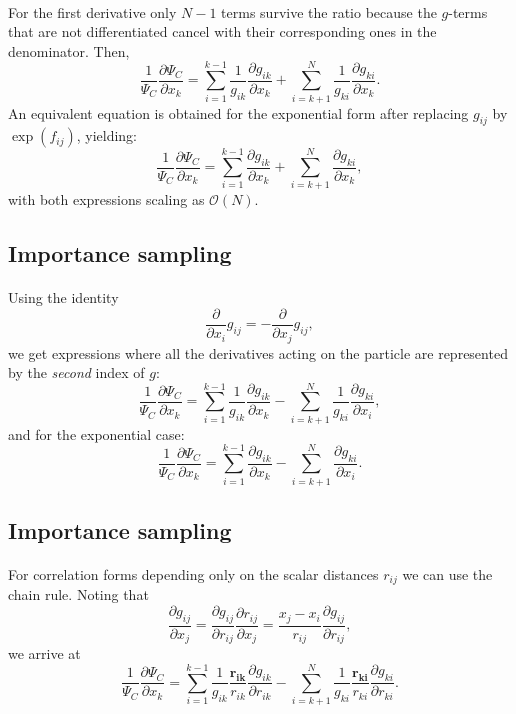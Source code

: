 \documentclass[%
twoside,                 %
final,                   %
10pt]{article}
\begin{document}
\paragraph{}
For the first derivative only $N-1$ terms survive the ratio because the $g$-terms that are not differentiated cancel with their corresponding ones in the denominator. Then,
\[
\frac{1}{\Psi_C}\frac{\partial \Psi_C}{\partial x_k} =
\sum_{i=1}^{k-1}\frac{1}{g_{ik}}\frac{\partial g_{ik}}{\partial x_k}
+
\sum_{i=k+1}^{N}\frac{1}{g_{ki}}\frac{\partial g_{ki}}{\partial x_k}.
\]
An equivalent equation is obtained for the exponential form after replacing $g_{ij}$ by $\exp(f_{ij})$, yielding:
\[
\frac{1}{\Psi_C}\frac{\partial \Psi_C}{\partial x_k} =
\sum_{i=1}^{k-1}\frac{\partial g_{ik}}{\partial x_k}
+
\sum_{i=k+1}^{N}\frac{\partial g_{ki}}{\partial x_k},
\]
with both expressions scaling as $\mathcal{O}(N)$.




\subsection*{Importance sampling}

\paragraph{}

Using the identity 
\[
\frac{\partial}{\partial x_i}g_{ij} = -\frac{\partial}{\partial x_j}g_{ij},
\]
we get expressions where all the derivatives acting on the particle  are represented by the \emph{second} index of $g$:
\[
\frac{1}{\Psi_C}\frac{\partial \Psi_C}{\partial x_k} =
\sum_{i=1}^{k-1}\frac{1}{g_{ik}}\frac{\partial g_{ik}}{\partial x_k}
-\sum_{i=k+1}^{N}\frac{1}{g_{ki}}\frac{\partial g_{ki}}{\partial x_i},
\]
and for the exponential case:
\[
\frac{1}{\Psi_C}\frac{\partial \Psi_C}{\partial x_k} =
\sum_{i=1}^{k-1}\frac{\partial g_{ik}}{\partial x_k}
-\sum_{i=k+1}^{N}\frac{\partial g_{ki}}{\partial x_i}.
\]



\subsection*{Importance sampling}

\paragraph{}
For correlation forms depending only on the scalar distances $r_{ij}$ we can use the chain rule. Noting that 
\[
\frac{\partial g_{ij}}{\partial x_j} = \frac{\partial g_{ij}}{\partial r_{ij}} \frac{\partial r_{ij}}{\partial x_j} = \frac{x_j - x_i}{r_{ij}} \frac{\partial g_{ij}}{\partial r_{ij}},
\]
we arrive at
\[
\frac{1}{\Psi_C}\frac{\partial \Psi_C}{\partial x_k} = 
\sum_{i=1}^{k-1}\frac{1}{g_{ik}} \frac{\mathbf{r_{ik}}}{r_{ik}} \frac{\partial g_{ik}}{\partial r_{ik}}
-\sum_{i=k+1}^{N}\frac{1}{g_{ki}}\frac{\mathbf{r_{ki}}}{r_{ki}}\frac{\partial g_{ki}}{\partial r_{ki}}.
\]
\end{document}
